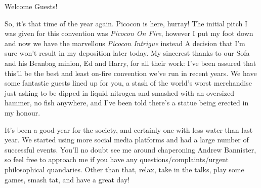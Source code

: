 Welcome Guests!

So, it’s that time of the year again. Picocon is here, hurray! The
initial pitch I was given for this convention was \emph{Picocon On
  Fire}, however I put my foot down and now we have the marvellous
\emph{Picocon Intrigue} instead \textemdash{} A decision that I'm sure
won't result in my deposition later today. My sincerest thanks to our
Sofa and his Beanbag minion, Ed and Harry, for all their work: I've
been assured that this'll be the best and least on-fire convention
we've run in recent years. We have some fantastic guests lined up for
you, a stash of the world's worst merchandise just asking to be dipped
in liquid nitrogen and smashed with an oversized hammer, no fish
anywhere, and I've been told there's a statue being erected in my
honour.

It's been a good year for the society, and certainly one with less
water than last year. We started using more social media platforms and
had a large number of successful events. You'll no doubt see me around
chaperoning Andrew Bannister, so feel free to approach me if you have
any questions/complaints/urgent philosophical quandaries. Other than
that, relax, take in the talks, play some games, smash tat, and have a
great day!
